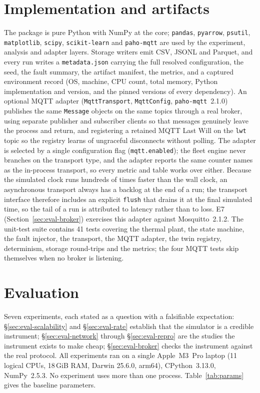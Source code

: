 \documentclass[preprint,12pt,authoryear,nopreprintline]{elsarticle}
\begin{document}
\section{Implementation and artifacts}
\label{sec:impl}
The package is pure Python with NumPy at the core; \texttt{pandas},
\texttt{pyarrow}, \texttt{psutil}, \texttt{matplotlib}, \texttt{scipy},
\texttt{scikit-learn} and \texttt{paho-mqtt} are used by the experiment, analysis
and adapter layers.
Storage writers emit CSV, JSONL and Parquet, and every run writes a
\texttt{metadata.json} carrying the full resolved configuration, the seed, the
fault summary, the artifact manifest, the metrics, and a captured environment
record (OS, machine, CPU count, total memory, Python implementation and version,
and the pinned versions of every dependency).
An optional MQTT adapter (\texttt{MqttTransport}, \texttt{MqttConfig},
\texttt{paho-mqtt}~2.1.0) publishes the same \texttt{Message} objects on the same
topics through a real broker, using separate publisher and subscriber clients so
that messages genuinely leave the process and return, and registering a retained
MQTT Last Will on the \texttt{lwt} topic so the registry learns of ungraceful
disconnects without polling.
The adapter is selected by a single configuration flag
(\texttt{mqtt.enabled}); the fleet engine never branches on the transport type,
and the adapter reports the same counter names as the in-process transport, so
every metric and table works over either.
Because the simulated clock runs hundreds of times faster than the wall clock, an
asynchronous transport always has a backlog at the end of a run; the transport
interface therefore includes an explicit \texttt{flush} that drains it at the final
simulated time, so the tail of a run is attributed to latency rather than to loss.
E7 (Section~\ref{sec:eval-broker}) exercises this adapter against
Mosquitto~2.1.2.
The unit-test suite contains 41 tests covering the thermal plant, the state
machine, the fault injector, the transport, the MQTT adapter, the twin registry,
determinism, storage round-trips and the metrics; the four MQTT tests skip
themselves when no broker is listening.

\section{Evaluation}
\label{sec:eval}
Seven experiments, each stated as a question with a falsifiable expectation:
\S\ref{sec:eval-scalability} and \S\ref{sec:eval-rate} establish that the
simulator is a credible instrument; \S\ref{sec:eval-network} through
\S\ref{sec:eval-repro} are the studies the instrument exists to make cheap;
\S\ref{sec:eval-broker} checks the instrument against the real protocol.
All experiments ran on a single Apple~M3~Pro laptop (11 logical CPUs, 18\,GiB
RAM, Darwin 25.6.0, arm64), CPython~3.13.0, NumPy~2.5.3.
No experiment uses more than one process.
Table~\ref{tab:params} gives the baseline parameters.
\end{document}
